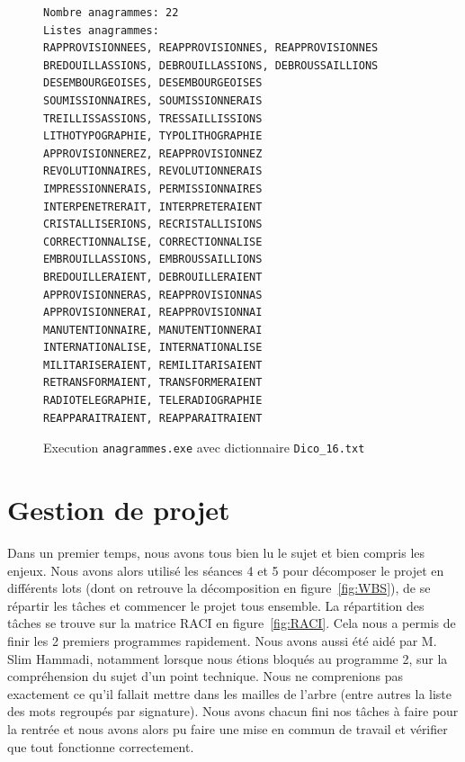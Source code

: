 \documentclass{article} %
\begin{document}
\begin{figure}[H]
  \begin{lstlisting}
Nombre anagrammes: 22
Listes anagrammes:
RAPPROVISIONNEES, REAPPROVISIONNES, REAPPROVISIONNES
BREDOUILLASSIONS, DEBROUILLASSIONS, DEBROUSSAILLIONS
DESEMBOURGEOISES, DESEMBOURGEOISES
SOUMISSIONNAIRES, SOUMISSIONNERAIS
TREILLISSASSIONS, TRESSAILLISSIONS
LITHOTYPOGRAPHIE, TYPOLITHOGRAPHIE
APPROVISIONNEREZ, REAPPROVISIONNEZ
REVOLUTIONNAIRES, REVOLUTIONNERAIS
IMPRESSIONNERAIS, PERMISSIONNAIRES
INTERPENETRERAIT, INTERPRETERAIENT
CRISTALLISERIONS, RECRISTALLISIONS
CORRECTIONNALISE, CORRECTIONNALISE
EMBROUILLASSIONS, EMBROUSSAILLIONS
BREDOUILLERAIENT, DEBROUILLERAIENT
APPROVISIONNERAS, REAPPROVISIONNAS
APPROVISIONNERAI, REAPPROVISIONNAI
MANUTENTIONNAIRE, MANUTENTIONNERAI
INTERNATIONALISE, INTERNATIONALISE
MILITARISERAIENT, REMILITARISAIENT
RETRANSFORMAIENT, TRANSFORMERAIENT
RADIOTELEGRAPHIE, TELERADIOGRAPHIE
REAPPARAITRAIENT, REAPPARAITRAIENT\end{lstlisting}
\caption{Execution \texttt{anagrammes.exe} avec dictionnaire \texttt{Dico\_16.txt}}
\label{fig:prog_3_1}
\end{figure}



\section{Gestion de projet} Dans un premier temps, nous avons tous bien lu le sujet et bien compris les enjeux. Nous avons alors utilisé les séances 4 et 5 pour décomposer le projet en différents lots (dont on retrouve la décomposition en figure~\ref{fig:WBS}), de se répartir les tâches et commencer le projet tous ensemble. La répartition des tâches se trouve sur la matrice RACI en figure~\ref{fig:RACI}. Cela nous a permis de finir les 2 premiers programmes rapidement. Nous avons aussi été aidé par M. Slim Hammadi, notamment lorsque nous étions bloqués au programme 2, sur la compréhension du sujet d'un point technique. Nous ne comprenions pas exactement ce qu'il fallait mettre dans les mailles de l'arbre (entre autres la liste des mots regroupés par signature). Nous avons chacun fini nos tâches à faire pour la rentrée et nous avons alors pu faire une mise en commun de travail et vérifier que tout fonctionne correctement.
\end{document}
